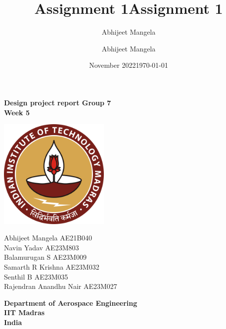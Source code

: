 \documentclass[12 pt]{article}
\title{Assignment 1}
\author{Abhijeet Mangela}
\date{November 2022}
\title{Assignment 1}
\author{Abhijeet Mangela}
\date{\today}
\begin{document}
\begin{titlepage}
\begin{center}

\textbf{\huge Design project report Group 7 \\ \vspace{0.5 cm} Week 5} \\

\vspace{2 cm}

\centering
\includegraphics[width=0.4\textwidth]{IIT_Madras_Logo.svg.png}
\label{fig:my_label}

\vspace{2 cm}

\Large{Abhijeet Mangela AE21B040 \\ \vspace{0.2 cm} Navin Yadav AE23M803 \\ \vspace{0.2 cm} Balamurugan S AE23M009 \\ \vspace{0.2 cm} Samarth R Krishna AE23M032 \\ \vspace{0.2 cm} Senthil B AE23M035 \\ \vspace{0.2 cm} Rajendran Anandhu Nair AE23M027 }

\vspace{1.0 cm}

\textbf{\Large Department of Aerospace Engineering } \\ \vspace{0.2 cm}
\textbf{\Large IIT Madras} \\ \vspace{0.2 cm}
\textbf{\Large India} \\ 

\normalsize

\end{center}
\end{titlepage}
\end{document}
